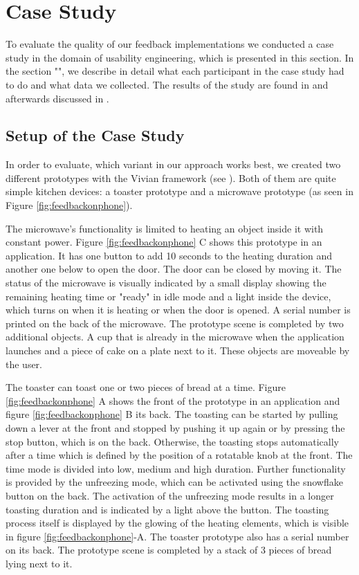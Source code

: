 \documentclass[11pt, a4paper]{article}
\begin{document}
	\section*{Case Study}\label{sec:casestudy}
		To evaluate the quality of our feedback implementations we conducted a case study in the domain of usability engineering, which is presented in this section. In the section "", we describe in detail what each participant in the case study had to do and what data we collected. The results of the study are found in  and afterwards discussed in .
		
		\subsection*{Setup of the Case Study}\label{ssec:setup}
			In order to evaluate, which variant in our approach works best, we created two different prototypes with the Vivian framework (see ). Both of them are quite simple kitchen devices: a toaster prototype and a microwave prototype (as seen in Figure \ref{fig:feedbackonphone}).

			The microwave's functionality is limited to heating an object inside it with constant power. Figure \ref{fig:feedbackonphone} C shows this prototype in an application. It has one button to add 10 seconds to the heating duration and another one below to open the door. The door can be closed by moving it. The status of the microwave is visually indicated by a small display showing the remaining heating time or "ready" in idle mode and a light inside the device, which turns on when it is heating or when the door is opened. A serial number is printed on the back of the microwave. The prototype scene is completed by two additional objects. A cup that is already in the microwave when the application launches and a piece of cake on a plate next to it. These objects are moveable by the user.

			The toaster can toast one or two pieces of bread at a time. Figure \ref{fig:feedbackonphone} A shows the front of the prototype in an application and figure \ref{fig:feedbackonphone} B its back. The toasting can be started by pulling down a lever at the front and stopped by pushing it up again or by pressing the stop button, which is on the back. Otherwise, the toasting stops automatically after a time which is defined by the position of a rotatable knob at the front. The time mode is divided into low, medium and high duration. Further functionality is provided by the unfreezing mode, which can be activated using the snowflake button on the back. The activation of the unfreezing mode results in a longer toasting duration and is indicated by a light above the button. The toasting process itself is displayed by the glowing of the heating elements, which is visible in figure \ref{fig:feedbackonphone}-A. The toaster prototype also has a serial number on its back. The prototype scene is completed by a stack of 3 pieces of bread lying next to it. 
			
\end{document}
